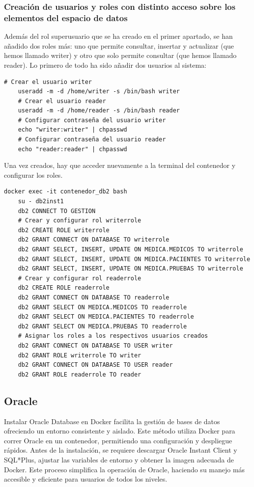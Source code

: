 \documentclass{article}
\begin{document}
\subsubsection{Creación	de usuarios y roles con	distinto acceso	sobre los elementos	del espacio	de datos}
Además del rol superusuario que se ha creado en el primer apartado, se han añadido dos roles más: uno que permite consultar, insertar y actualizar (que hemos llamado writer) y otro que solo permite consultar (que hemos llamado reader).
Lo primero de todo ha sido añadir dos usuarios al sistema:
\begin{lstlisting}[style=bashStyle]
    # Crear el usuario writer
    useradd -m -d /home/writer -s /bin/bash writer
    # Crear el usuario reader
    useradd -m -d /home/reader -s /bin/bash reader
    # Configurar contraseña del usuario writer
    echo "writer:writer" | chpasswd
    # Configurar contraseña del usuario reader
    echo "reader:reader" | chpasswd
\end{lstlisting}
Una vez creados, hay que acceder nuevamente a la terminal del contenedor y configurar los roles.
\begin{lstlisting}[style=bashStyle]
    docker exec -it contenedor_db2 bash
    su - db2inst1
    db2 CONNECT TO GESTION
    # Crear y configurar rol writerrole
    db2 CREATE ROLE writerrole
    db2 GRANT CONNECT ON DATABASE TO writerrole
    db2 GRANT SELECT, INSERT, UPDATE ON MEDICA.MEDICOS TO writerrole
    db2 GRANT SELECT, INSERT, UPDATE ON MEDICA.PACIENTES TO writerrole
    db2 GRANT SELECT, INSERT, UPDATE ON MEDICA.PRUEBAS TO writerrole
    # Crear y configurar rol readerrole
    db2 CREATE ROLE readerrole
    db2 GRANT CONNECT ON DATABASE TO readerrole
    db2 GRANT SELECT ON MEDICA.MEDICOS TO readerrole
    db2 GRANT SELECT ON MEDICA.PACIENTES TO readerrole
    db2 GRANT SELECT ON MEDICA.PRUEBAS TO readerrole
    # Asignar los roles a los respectivos usuarios creados
    db2 GRANT CONNECT ON DATABASE TO USER writer
    db2 GRANT ROLE writerrole TO writer
    db2 GRANT CONNECT ON DATABASE TO USER reader
    db2 GRANT ROLE readerrole TO reader
\end{lstlisting}

\subsection{Oracle}
Instalar Oracle Database en Docker facilita la gestión de bases de datos ofreciendo un entorno consistente y aislado. Este método utiliza Docker para correr Oracle en un contenedor, permitiendo una configuración y despliegue rápidos. Antes de la instalación, se requiere descargar Oracle Instant Client y SQL*Plus, ajustar las variables de entorno y obtener la imagen adecuada de Docker. Este proceso simplifica la operación de Oracle, haciendo su manejo más accesible y eficiente para usuarios de todos los niveles.
\end{document}
